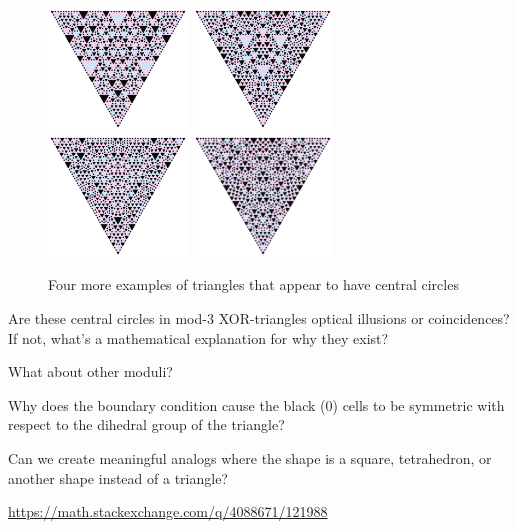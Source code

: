 \documentclass{article}
\begin{document}
\begin{figure}[ht!]
  \centering
  \includegraphics[width=10em]{assets/124_problem/triangle101_1.png}
  \includegraphics[width=10em]{assets/124_problem/triangle101_2.png}
  \includegraphics[width=10em]{assets/124_problem/triangle101_3.png}
  \includegraphics[width=10em]{assets/124_problem/triangle101_4.png}
  \caption{Four more examples of triangles that appear to have central circles}
\end{figure}

\begin{question}
  Are these central circles in mod-$3$ XOR-triangles optical illusions or
  coincidences?
  If not, what's a mathematical explanation for why they exist?
\end{question}

\begin{related}
  \item What about other moduli?
  \item Why does the boundary condition cause the black ($0$) cells to be
  symmetric with respect to the dihedral group of the triangle?
  \item Can we create meaningful analogs where the shape is a square,
  tetrahedron, or another shape instead of a triangle?
\end{related}

\begin{references}
  \item \url{https://math.stackexchange.com/q/4088671/121988}
\end{references}
\end{document}

